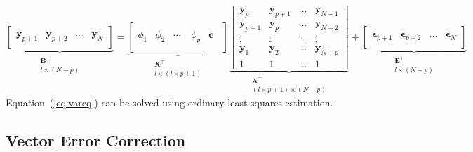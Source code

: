 \begin{equation}
 \label{eq:vareq}
               \underbrace{ \begin{bmatrix}
               \quad \\
               \mathbf{y}_{p+1} &
               \mathbf{y}_{p+2} &
               \dots & 
               \mathbf{y}_N \\
               \quad
               \end{bmatrix}}_{\substack{ \mathbf{B}^\top\\l \times (N-p)}}   
= 
                \underbrace{\left[ 
                \begin{array}{ccccc}
                \quad & \quad & \quad & \quad & \quad \\
                \phi_1  & \phi_2 & \cdots & \phi_p & \mathbf{c} \\  
                \quad &\quad & \quad & \quad & \quad
               \end{array} 
               \right]}_{\substack{ \mathbf{X}^\top\\ l \times (l \times p + 1 )}}
\underbrace{\begin{bmatrix}
   \mathbf{y}_{p}  & \mathbf{y}_{p+1} & \dots    & \mathbf{y}_{N-1}\\
   \mathbf{y}_{p-1}  & \mathbf{y}_{p} & \dots    & \mathbf{y}_{N-2}\\
   \vdots        & \vdots   & \ddots   & \vdots\\
   \mathbf{y}_{1} & \mathbf{y}_{2}   & \dots    & \mathbf{y}_{N-p}\\
   1 & 1   & \dots    & 1 
   \end{bmatrix}}_{\substack{ \mathbf{A}^\top\\ (l\times p +1 )\times (N-p)}}
+
\underbrace{\begin{bmatrix}
                \quad \\
              \mathbf{\epsilon}_{p+1}  & 
              \mathbf{\epsilon}_{p+2}  & 
              \dots                & 
              \mathbf{\epsilon}_N \\
              \quad
             \end{bmatrix}}_{\substack{\mathbf{E}^\top\\l \times (N-p) }} 
\end{equation}
Equation~(\ref{eq:vareq})  can be solved using ordinary least squares estimation.

\subsection{Vector Error Correction}

